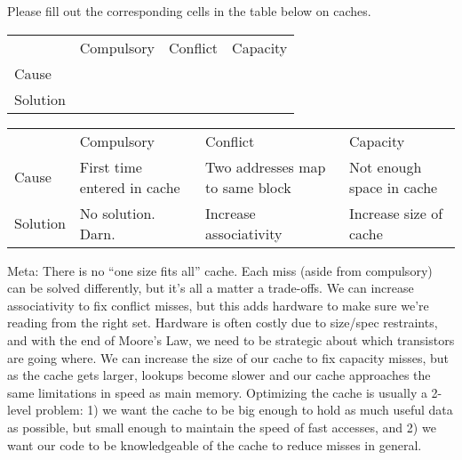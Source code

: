 \begin{blocksection}
\question
Please fill out the corresponding cells in the table below on caches.

\begin{tabular}{llll}
 & Compulsory & Conflict & Capacity \\
Cause & & & \\
Solution & & &
\end{tabular}

\begin{solution}
\begin{tabular}{llll}
 & Compulsory & Conflict & Capacity \\
Cause & First time entered in cache & Two addresses map to same block & Not enough space in cache \\
Solution & No solution. Darn. & Increase associativity & Increase size of cache
\end{tabular}

Meta: There is no “one size fits all” cache. Each miss (aside from compulsory) can be solved differently, but it’s all a matter a trade-offs. We can increase associativity to fix conflict misses, but this adds hardware to make sure we’re reading from the right set. Hardware is often costly due to size/spec restraints, and with the end of Moore’s Law, we need to be strategic about which transistors are going where. We can increase the size of our cache to fix capacity misses, but as the cache gets larger, lookups become slower and our cache approaches the same limitations in speed as main memory. Optimizing the cache is usually a 2-level problem: 1) we want the cache to be big enough to hold as much useful data as possible, but small enough to maintain the speed of fast accesses, and 2) we want our code to be knowledgeable of the cache to reduce misses in general.

\end{solution}

\end{blocksection}